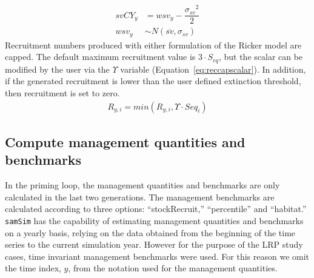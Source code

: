 \documentclass[11pt]{book}
\begin{document}
\begin{align}
  svCY_{y} &= wsv_{y} - \dfrac{{\sigma_{sv}}^2}{2}\\
  wsv_{y} &\sim N(\overline{sv},\sigma_{sv})
  \label{eq:survCY}
\end{align}
Recruitment numbers produced with either formulation of the Ricker model are capped. The default maximum recruitment value is \(3 \cdot S_{eq}\), but the scalar can be modified by the user via the \(\Upsilon\) variable (Equation~\ref{eq:reccapscalar}). In addition, if the generated recruitment is lower than the user defined extinction threshold, then recruitment is set to zero.
\begin{align}
  R_{y,i} = min(R_{y,i}, \Upsilon \cdot Seq_{i})
  \label{eq:reccapscalar}
\end{align}
\hypertarget{compute-management-quantities-and-benchmarks}{%
\subsection{Compute management quantities and benchmarks}\label{compute-management-quantities-and-benchmarks}}

In the priming loop, the management quantities and benchmarks are only calculated in the last two generations. The management benchmarks are calculated according to three options: ``stockRecruit,'' ``percentile'' and ``habitat.'' \texttt{samSim} has the capability of estimating management quantities and benchmarks on a yearly basis, relying on the data obtained from the beginning of the time series to the current simulation year. However for the purpose of the LRP study cases, time invariant management benchmarks were used. For this reason we omit the time index, \(y\), from the notation used for the management quantities.
\end{document}

